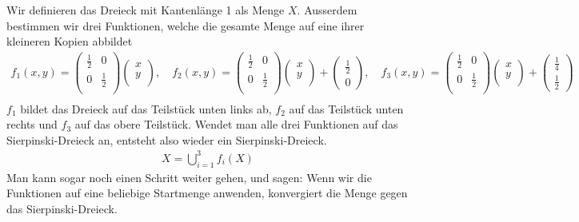 Wir definieren das Dreieck mit Kantenlänge 1 als Menge $X$.
Ausserdem bestimmen wir drei Funktionen, welche die gesamte Menge auf eine ihrer kleineren Kopien abbildet
\begin{align*}
	f_1(x,y)
	= 
	\begin{pmatrix}
		\frac{1}{2} & 0 \\
		0 & \frac{1}{2} \\
	\end{pmatrix}
	\begin{pmatrix}
		x\\
		y\\
	\end{pmatrix} 
	,\quad
	f_2(x,y)
	= 
	\begin{pmatrix}
		\frac{1}{2} & 0 \\
		0 & \frac{1}{2} \\
	\end{pmatrix}
	\begin{pmatrix}
		x\\
		y\\
	\end{pmatrix} 
	+
	\begin{pmatrix}
		\frac{1}{2} \\
		0
	\end{pmatrix}
	, \quad
	f_3(x,y)
	= 
	\begin{pmatrix}
		\frac{1}{2} & 0 \\
		0 & \frac{1}{2} \\
	\end{pmatrix}
	\begin{pmatrix}
		x\\
		y\\
	\end{pmatrix} 
	+
	\begin{pmatrix}
		\frac{1}{4} \\
		\frac{1}{2}
	\end{pmatrix}\\
\end{align*}
$f_1$ bildet das Dreieck auf das Teilstück unten links ab, $f_2$ auf das Teilstück unten rechts und $f_3$ auf das obere Teilstück.
Wendet man alle drei Funktionen auf das Sierpinski-Dreieck an, entsteht also wieder ein Sierpinski-Dreieck.
\begin{align*}
	X = \bigcup\limits_{i = 1}^{3} f_i(X)
\end{align*}
Man kann sogar noch einen Schritt weiter gehen, und sagen: Wenn wir die Funktionen auf eine beliebige Startmenge anwenden, konvergiert die Menge gegen das Sierpinski-Dreieck.
